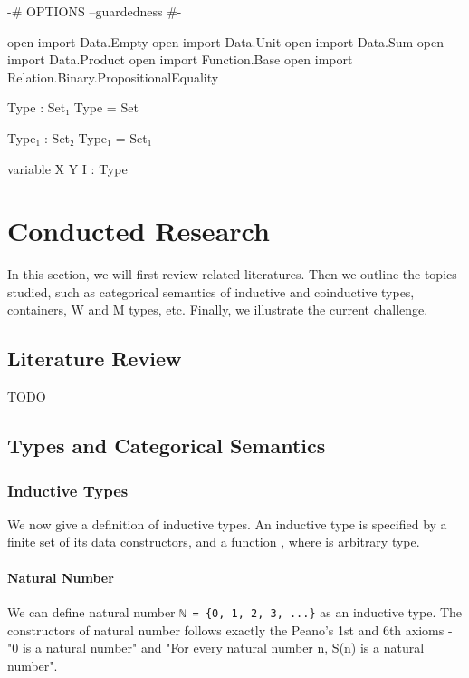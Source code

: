 \begin{code}[hide]
{-# OPTIONS --guardedness #-}

open import Data.Empty
open import Data.Unit
open import Data.Sum
open import Data.Product
open import Function.Base
open import Relation.Binary.PropositionalEquality

Type : Set₁
Type = Set

Type₁ : Set₂
Type₁ = Set₁

variable X Y I : Type
\end{code}

\chapter{Conducted Research}

In this section, we will first review related literatures. Then we outline the topics studied, such as categorical semantics of inductive and coinductive types, containers, W and M types, etc. Finally, we illustrate the current challenge.

\section{Literature Review}
TODO

\section{Types and Categorical Semantics}

\subsection{Inductive Types}

We now give a definition of inductive types. An inductive type  is specified by a finite set of its data constructors, and a function  \AgdaSymbol{:}   , where  is arbitrary type.

\subsubsection*{Natural Number}

We can define natural number \texttt{ℕ = \{0, 1, 2, 3, ...\}} as an inductive type. The constructors of natural number  follows exactly the Peano's 1st and 6th axioms - "0 is a natural number" and "For every natural number n, S(n) is a natural number".

